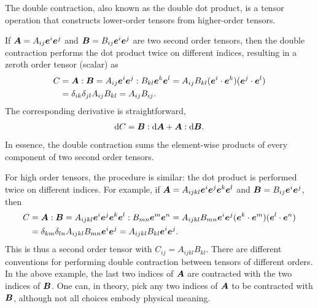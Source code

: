 The double contraction, also known as the double dot product, is a tensor operation that constructs lower-order tensors from higher-order tensors.

If $\bm{A}=A_{ij}\bm{e}^i\bm{e}^j$ and $\bm{B}=B_{ij}\bm{e}^i\bm{e}^j$ are two second order tensors, then the double contraction performs the dot product twice on different indices, resulting in a zeroth order tensor (scalar) as
\begin{gather}\label{eq:double_contraction}
\begin{split}
C&=\bm{A}:\bm{B}=A_{ij}\bm{e}^i\bm{e}^j:B_{kl}\bm{e}^k\bm{e}^l=A_{ij}B_{kl}(\bm{e}^i\cdot\bm{e}^k)(\bm{e}^j\cdot\bm{e}^l)\\&=\delta_{ik}\delta_{jl}A_{ij}B_{kl}=A_{ij}B_{ij}.
\end{split}
\end{gather}
The corresponding derivative is straightforward,
\begin{gather}
    \mathrm{d}C=\bm{B}:\mathrm{d}\bm{A}+\bm{A}:\mathrm{d}\bm{B}.
\end{gather}
In essence, the double contraction sums the element-wise products of every component of two second order tensors.

For high order tensors, the procedure is similar: the dot product is performed twice on different indices.
For example, if $\bm{A}=A_{ijkl}\bm{e}^i\bm{e}^j\bm{e}^k\bm{e}^l$ and $\bm{B}=B_{ij}\bm{e}^i\bm{e}^j$, then
\begin{gather}
    \begin{split}
        C & =\bm{A}:\bm{B}=A_{ijkl}\bm{e}^i\bm{e}^j\bm{e}^k\bm{e}^l:B_{mn}\bm{e}^m\bm{e}^n=A_{ijkl}B_{mn}\bm{e}^i\bm{e}^j(\bm{e}^k\cdot\bm{e}^m)(\bm{e}^l\cdot\bm{e}^n) \\&=\delta_{km}\delta_{ln}A_{ijkl}B_{mn}\bm{e}^i\bm{e}^j=A_{ijkl}B_{kl}\bm{e}^i\bm{e}^j.
    \end{split}
\end{gather}
This is thus a second order tensor with $C_{ij}=A_{ijkl}B_{kl}$.
There are different conventions for performing double contraction between tensors of different orders.
In the above example, the last two indices of $\bm{A}$ are contracted with the two indices of $\bm{B}$.
One can, in theory, pick any two indices of $\bm{A}$ to be contracted with $\bm{B}$, although not all choices embody physical meaning.
